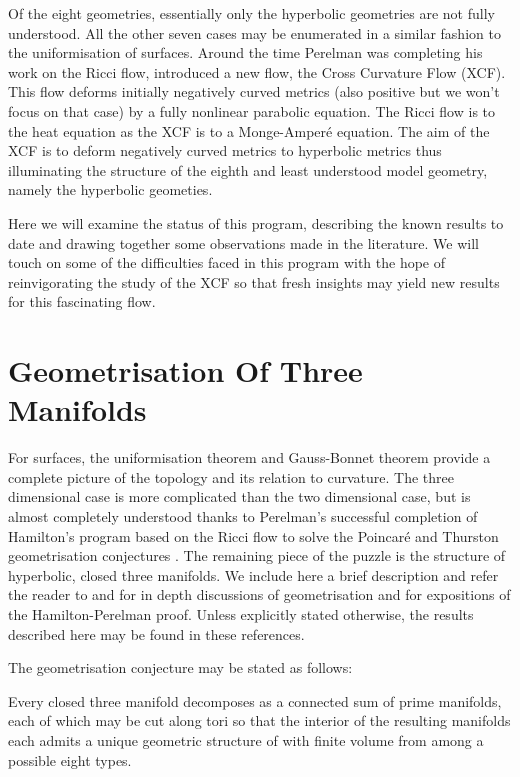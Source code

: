 \documentclass[a4paper,12pt]{amsart}
\begin{document}
Of the eight geometries, essentially only the hyperbolic geometries are not fully understood. All the other seven cases may be enumerated in a similar fashion to the uniformisation of surfaces. Around the time Perelman was completing his work on the Ricci flow, \cite{MR2055396} introduced a new flow, the Cross Curvature Flow (XCF). This flow deforms initially negatively curved metrics (also positive but we won't focus on that case) by a fully nonlinear parabolic equation. The Ricci flow is to the heat equation as the XCF is to a Monge-Amper\'e equation. The aim of the XCF is to deform negatively curved metrics to hyperbolic metrics thus illuminating the structure of the eighth and least understood model geometry, namely the hyperbolic geometies.

Here we will examine the status of this program, describing the known results to date and drawing together some observations made in the literature. We will touch on some of the difficulties faced in this program with the hope of reinvigorating the study of the XCF so that fresh insights may yield new results for this fascinating flow.

\section{Geometrisation Of Three Manifolds}
\label{sec:geometrisation}

For surfaces, the uniformisation theorem and Gauss-Bonnet theorem provide a complete picture of the topology and its relation to curvature. The three dimensional case is more complicated than the two dimensional case, but is almost completely understood thanks to Perelman's successful completion \cite{2003math......7245P,2003math......3109P,2002math.....11159P} of Hamilton's program based on the Ricci flow \cite{Hamilton:/1982} to solve the Poincar\'e and Thurston geometrisation conjectures \cite{MR648524}. The remaining piece of the puzzle is the structure of hyperbolic, closed three manifolds. We include here a brief description and refer the reader to \cite{MR705527} and \cite{MR1435975} for in depth discussions of geometrisation and \cite{MR3186136,MR2334563,MR2460872} for expositions of the Hamilton-Perelman proof. Unless explicitly stated otherwise, the results described here may be found in these references.

The geometrisation conjecture may be stated as follows:

\begin{thm}
\label{thm:geometrisation}

Every closed three manifold decomposes as a connected sum of prime manifolds, each of which may be cut along tori so that the interior of the resulting manifolds each admits a unique geometric structure of with finite volume from among a possible eight types.
\end{thm}
\end{document}
